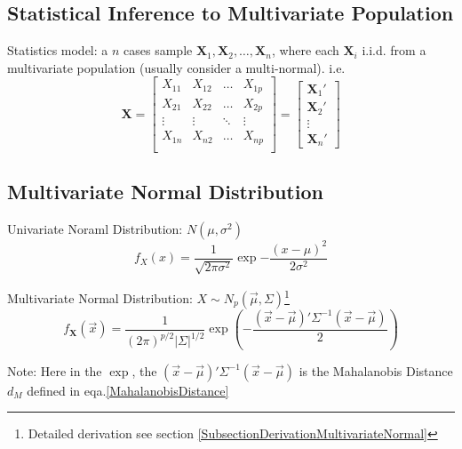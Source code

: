         

\subsection{Statistical Inference to Multivariate Population}
    Statistics model: a $ n $ cases sample $ \mathbf{X}_1,\mathbf{X}_2,\ldots,\mathbf{X}_n $, where each $ \mathbf{X}_i $ i.i.d. from a multivariate population (usually consider a multi-normal). i.e.
    \begin{equation}\label{EqaNPSampleMatrixNotation}
        \mathbf{X}=\begin{bmatrix}
            X_{11}&X_{12}&\ldots&X_{1p}\\
            X_{21}&X_{22}&\ldots&X_{2p}\\
            \vdots&\vdots&\ddots&\vdots\\
            X_{1n}&X_{n2}&\ldots&X_{np}\\
            \end{bmatrix} 
            =
            \begin{bmatrix}
                \mathbf{X}_1'\\
                \mathbf{X}_2'\\
                \vdots\\
                \mathbf{X}_n'
            \end{bmatrix}
    \end{equation}



\subsection{Multivariate Normal Distribution}
    Univariate Noraml Distribution: $ N(\mu,\sigma^2) $
    \begin{equation}
        f_X(x)=\dfrac{1}{\sqrt{2\pi\sigma ^2}}\exp{-\dfrac{(x-\mu)^2}{2\sigma ^2}} 
    \end{equation}
    
    Multivariate Normal Distribution: $X\sim N_p(\vec{\mu},\Sigma) $\footnote{Detailed derivation see section \ref{SubsectionDerivationMultivariateNormal}}
    \begin{equation}
        f_\mathbf{X}(\vec{x})=\dfrac{1}{(2\pi)^{p/2}|\Sigma |^{1/2}}\exp\left({-\dfrac{(\vec{x}-\vec{\mu})'\Sigma^{-1}(\vec{x}-\vec{\mu})}{2}} \right)
    \end{equation}

    Note: Here in the $ \exp $, the $ (\vec{x}-\vec{\mu})'\Sigma^{-1}(\vec{x}-\vec{\mu}) $ is the Mahalanobis Distance $ d_M $ defined in eqa.\ref{MahalanobisDistance}

